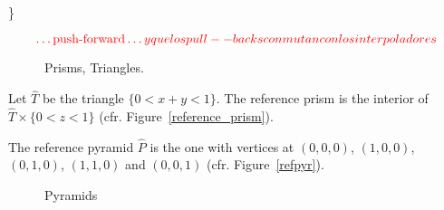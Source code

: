 \}

\label{sub:transformations}
\begin{equation}\label{push-forward}
	{\color{red} \ldots \mbox{push-forward} \ldots y que los pull--backs conmutan con los interpoladores}
\end{equation}
\begin{figure}[!h]
	\centering
	\hspace{1.8cm}
	\caption{Prisms, Triangles.}
\end{figure}

\begin{defi}\label{defi_of_ref_prism}
Let $\hat T$ be the triangle $\{ 0 < x + y < 1 \}$. 
The reference prism is the interior of 
$\hat T\times\{ 0 < z < 1 \}$ (cfr. Figure~\ref{reference_prism}).
\end{defi}
\begin{defi}\label{defi_of_ref_pyr}
The reference pyramid $\hat P$ is the one with vertices at $(0,0,0)$,
$(1,0,0)$, $(0,1,0)$, $(1,1,0)$ and $(0,0,1)$ (cfr. Figure~\ref{refpyr}).
\end{defi}

\begin{figure}
	\centering
	\caption{Pyramids}
\end{figure}

